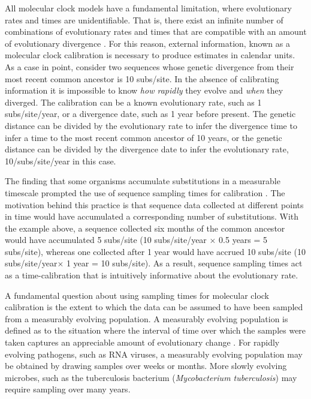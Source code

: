 \documentclass[10pt,letterpaper]{article}
\begin{document}
All molecular clock models have a fundamental limitation, where evolutionary rates and times are unidentifiable. That is, there exist an infinite number of combinations of evolutionary rates and times that are compatible with an amount of evolutionary divergence \cite{yang2006bayesian,dos2013unbearable}. For this reason, external information, known as a molecular clock calibration is necessary to produce estimates in calendar units. As a case in point, consider two sequences whose genetic divergence from their most recent common ancestor is 10 subs/site. In the absence of calibrating information it is impossible to know \textit{how rapidly} they evolve and \textit{when} they diverged. The calibration can be a known evolutionary rate, such as 1 subs/site/year, or a divergence date, such as 1 year before present. The genetic distance can be divided by the evolutionary rate to infer the divergence time to infer a time to the most recent common ancestor of 10 years, or the genetic distance can be divided by the divergence date to infer the evolutionary rate, 10/subs/site/year in this case.

The finding that some organisms accumulate substitutions in a measurable timescale prompted the use of sequence sampling times for calibration \cite{rodrigo1999coalescent, korber2000timing}. The motivation behind this practice is that sequence data collected at different points in time would have accumulated a corresponding number of substitutions. With the example above, a sequence collected six months of the common ancestor would have accumulated 5 subs/site (10 subs/site/year $\times$ 0.5 years = 5 subs/site), whereas one collected after 1 year would have accrued 10 subs/site (10 subs/site/year$\times$ 1 year = 10 subs/site). As a result, sequence sampling times act as a time-calibration that is intuitively informative about the evolutionary rate.

A fundamental question about using sampling times for molecular clock calibration is the extent to which the data can be assumed to have been sampled from a measurably evolving population. A measurably evolving population is defined as to the situation where the interval of time over which the samples were taken captures an appreciable amount of evolutionary change \cite{drummond2003measurably}. For rapidly evolving pathogens, such as RNA viruses, a measurably evolving population may be obtained by drawing samples over weeks or months. More slowly evolving microbes, such as the tuberculosis bacterium (\textit{Mycobacterium tuberculosis}) may require sampling over many years. 
\end{document}
